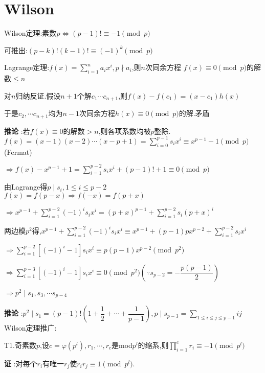
\section{Wilson}
Wilson定理:素数$ p \Leftrightarrow (p-1)!\equiv -1 \pmod p$

可推出:$ (p-k)!(k-1)!\equiv (-1)^k \pmod p$

Lagrange定理:$ f(x)=\sum_{i=1}^{n}{a_ix^i},p \nmid a_i$,则$ n$次同余方程
$ f(x) \equiv 0  \pmod p$的解数$  \le n$

对$ n$归纳反证.假设$ n+1$个解$ c_1\cdots c_{n+1}$,则$ f(x)-f(c_1)=(x-c_1)h(x)$

于是$ c_2,\cdots c_{n+1}$均为$ n-1$次同余方程$ h(x)\equiv 0 \pmod p$的解.矛盾

{\bf 推论 }:若$ f(x)\equiv 0$的解数$ >n$,则各项系数均被$ p$整除.
\\

$ f(x)=(x-1)(x-2)\cdots (x-p+1)=\sum_{i=0}^{p-1}{s_ix^i}\equiv x^{p-1}-1 \pmod p $(Fermat)

$ \Rightarrow f(x)-x^{p-1}+1=\sum_{i=1}^{p-2}{s_ix^i}+(p-1)!+1\equiv 0 \pmod p$ 

由Lagrange得$ p\mid s_i,1\le i \le p-2$
\\

$ f(x)=f(p-x)\Rightarrow f(-x)=f(p+x)$ 

$ \Rightarrow x^{p-1}+\sum_{i=1}^{p-2}{(-1)^is_ix^i}=(p+x)^{p-1}+\sum_{i=1}^{p-2}{s_i(p+x)^i}$

两边模$ p^2$得,$ x^{p-1}+\sum_{i=1}^{p-2}{(-1)^is_ix^i}\equiv x^{p-1}+(p-1)px^{p-2}+\sum_{i=1}^{p-2}{s_ix^i}$

$ \Rightarrow \sum_{i=1}^{p-2}{[(-1)^i-1]s_ix^i}\equiv p(p-1)x^{p-2}\pmod {p^2}$ 

$ \Rightarrow \sum_{i=1}^{p-3}{[(-1)^i-1]s_ix^i}\equiv 0 \pmod {p^2}(\because s_{p-2}=-\dfrac{p(p-1)}{2})$

$ \Rightarrow p^2 \mid s_1,s_3,\cdots s_{p-4}$

{\bf 推论 }:$ p^2 \mid s_1=(p-1)!(1+\dfrac{1}{2}+\cdots+\dfrac{1}{p-1}),p \mid s_{p-3}=\sum_{1\le i\le j\le p-1}{ij}$
\\

Wilson定理推广:

T1.奇素数$ p$,设$ c=\varphi(p^l),r_1,\cdots,r_c$是mod$ p^l$的缩系,则$ \prod_{i=1}^{c}{r_i}\equiv -1 \pmod{p^l}$

{\bf 证 }:对每个$ r_i$有唯一$ r_j$使$ r_ir_j\equiv1\pmod{p^l}.$


